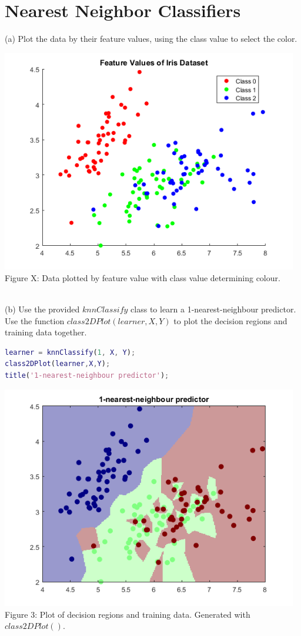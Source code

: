 \documentclass[]{report}   %
\begin{document}
\section{Nearest Neighbor Classifiers}
(a) Plot the data by their feature values, using the class value to select the color.
\begin{center}
	\includegraphics[width=35em]{2_4_Figure_1.png}
	{Figure X: Data plotted by feature value with class value determining colour.}
\end{center} 
~\\
(b) Use the provided $knnClassify$ class to learn a 1-nearest-neighbour predictor. Use the function $class2DPlot(learner,X,Y)$ to plot the decision regions and training data together.
\begin{lstlisting}[language=Matlab, caption=Teaching the 1-nearest-neighbour predictor.]
learner = knnClassify(1, X, Y);
class2DPlot(learner,X,Y);
title('1-nearest-neighbour predictor');
\end{lstlisting}
\begin{center}
	\includegraphics[width=35em]{2_4_Figure_2.png}
	{Figure 3: Plot of decision regions and training data. Generated with $class2DPlot()$.}
\end{center} 
\end{document}
